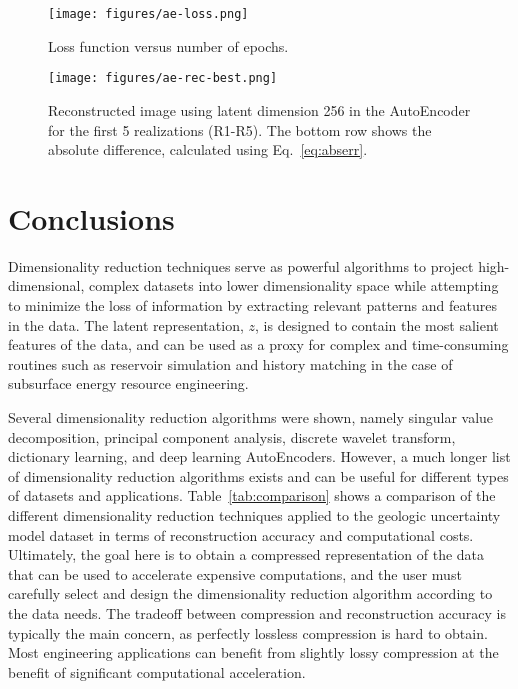 \documentclass[a4paper,fleqn,12pt]{article}
\begin{document}
\begin{figure}[H]
    \centering
    \texttt{[image: figures/ae-loss.png]}
    \caption{Loss function versus number of epochs.}
    \label{fig:ae-loss}
\end{figure}

\begin{figure}[H]
    \centering
    \texttt{[image: figures/ae-rec-best.png]}
    \caption{Reconstructed image using latent dimension 256 in the AutoEncoder for the first 5 realizations (R1-R5). The bottom row shows the absolute difference, calculated using Eq.~\ref{eq:abserr}.}
    \label{fig:ae-rec-best}
\end{figure}

\pagebreak
\section*{Conclusions}
Dimensionality reduction techniques serve as powerful algorithms to project high-dimensional, complex datasets into lower dimensionality space while attempting to minimize the loss of information by extracting relevant patterns and features in the data. The latent representation, $z$, is designed to contain the most salient features of the data, and can be used as a proxy for complex and time-consuming routines such as reservoir simulation and history matching in the case of subsurface energy resource engineering.

Several dimensionality reduction algorithms were shown, namely singular value decomposition, principal component analysis, discrete wavelet transform, dictionary learning, and deep learning AutoEncoders. However, a much longer list of dimensionality reduction algorithms exists and can be useful for different types of datasets and applications. Table~\ref{tab:comparison} shows a comparison of the different dimensionality reduction techniques applied to the geologic uncertainty model dataset in terms of reconstruction accuracy and computational costs. Ultimately, the goal here is to obtain a compressed representation of the data that can be used to accelerate expensive computations, and the user must carefully select and design the dimensionality reduction algorithm according to the data needs. The tradeoff between compression and reconstruction accuracy is typically the main concern, as perfectly lossless compression is hard to obtain. Most engineering applications can benefit from slightly lossy compression at the benefit of significant computational acceleration.
\end{document}
